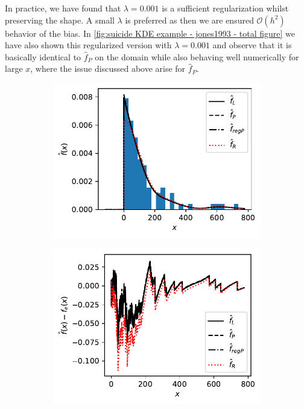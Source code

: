 \documentclass[../Thesis.tex]{subfiles}
\begin{document}
In practice, we have found that $\lambda = 0.001$ is a sufficient regularization whilst preserving the shape. A small $\lambda$ is preferred as then we are ensured $\mathcal{O}\left(h^2\right)$ behavior of the bias. In \autoref{fig:suicide KDE example - jones1993 - total figure} we have also shown this regularized version with $\lambda = 0.001$ and observe that it is basically identical to $\hat{f}_P$ on the domain while also behaving well numerically for large $x$, where the issue discussed above arise for $\hat{f}_P$.
\begin{figure}[h]
    \centering
    \begin{subfigure}[t]{0.49\linewidth}
        \centering
        \includegraphics[width = \linewidth]{figures/MI estimation/suicide data example - Jones1993.pdf}
        \caption{}
        \label{fig:suicide KDE example - jones1993}
    \end{subfigure}
    \hfill
    \begin{subfigure}[t]{0.49\linewidth}
        \centering
        \includegraphics[width = \linewidth]{figures/MI estimation/suicide data example - Jones1993 - Kolmogorov Smirnov.pdf}
        \caption{}
        \label{fig:Kolmogorov Smirnov DN - jones1993}
    \end{subfigure}
    \caption{}
    \label{fig:suicide KDE example - jones1993 - total figure}
\end{figure}
\end{document}
